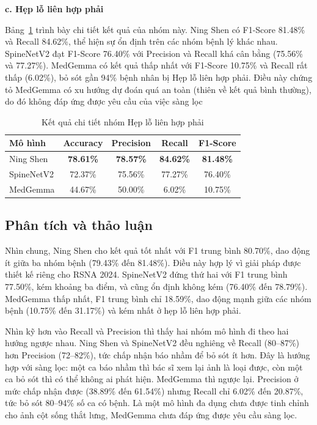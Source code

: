 \textbf{c. Hẹp lỗ liên hợp phải}

Bảng~\ref{tab:nfn_right_metrics} trình bày chi tiết kết quả của nhóm này. Ning Shen có F1-Score 81.48\% và Recall 84.62\%, thể hiện sự ổn định trên các nhóm bệnh lý khác nhau. SpineNetV2 đạt F1-Score 76.40\% với Precision và Recall khá cân bằng (75.56\% và 77.27\%). MedGemma có kết quả thấp nhất với F1-Score 10.75\% và Recall rất thấp (6.02\%), bỏ sót gần 94\% bệnh nhân bị Hẹp lỗ liên hợp phải. Điều này chứng tỏ MedGemma có xu hướng dự đoán quá an toàn (thiên về kết quả bình thường), do đó không đáp ứng được yêu cầu của việc sàng lọc

\begin{table}[H]
    \centering
    \caption{Kết quả chi tiết nhóm Hẹp lỗ liên hợp phải}
    \label{tab:nfn_right_metrics}
    \renewcommand{\arraystretch}{1.2}
    \begin{tabular}{lcccc}
        \toprule
        \textbf{Mô hình} & \textbf{Accuracy} & \textbf{Precision} & \textbf{Recall} & \textbf{F1-Score} \\
        \midrule
        Ning Shen & \textbf{78.61\%} & \textbf{78.57\%} & \textbf{84.62\%} & \textbf{81.48\%} \\
        SpineNetV2 & 72.37\% & 75.56\% & 77.27\% & 76.40\% \\
        MedGemma & 44.67\% & 50.00\% & 6.02\% & 10.75\% \\
        \bottomrule
    \end{tabular}
\end{table}

\subsection{Phân tích và thảo luận}

Nhìn chung, Ning Shen cho kết quả tốt nhất với F1 trung bình 80.70\%, dao động ít giữa ba nhóm bệnh (79.43\% đến 81.48\%). Điều này hợp lý vì giải pháp được thiết kế riêng cho RSNA 2024. SpineNetV2 đứng thứ hai với F1 trung bình 77.50\%, kém khoảng ba điểm, và cũng ổn định không kém (76.40\% đến 78.79\%). MedGemma thấp nhất, F1 trung bình chỉ 18.59\%, dao động mạnh giữa các nhóm bệnh (10.75\% đến 31.17\%) và kém nhất ở hẹp lỗ liên hợp phải.

Nhìn kỹ hơn vào Recall và Precision thì thấy hai nhóm mô hình đi theo hai hướng ngược nhau. Ning Shen và SpineNetV2 đều nghiêng về Recall (80--87\%) hơn Precision (72--82\%), tức chấp nhận báo nhầm để bỏ sót ít hơn. Đây là hướng hợp với sàng lọc: một ca báo nhầm thì bác sĩ xem lại ảnh là loại được, còn một ca bỏ sót thì có thể không ai phát hiện. MedGemma thì ngược lại. Precision ở mức chấp nhận được (38.89\% đến 61.54\%) nhưng Recall chỉ 6.02\% đến 20.87\%, tức bỏ sót 80--94\% số ca có bệnh. Là một mô hình đa dụng chưa được tinh chỉnh cho ảnh cột sống thắt lưng, MedGemma chưa đáp ứng được yêu cầu sàng lọc.

